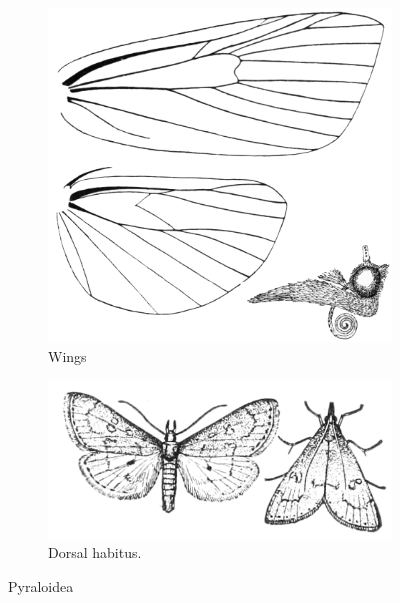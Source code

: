 \documentclass[letterpaper, 11pt]{article}
\begin{document}
\begin{figure}[ht!]
    \centering
    \begin{subfigure}[ht!]{0.38\textwidth}
        \includegraphics[width=\textwidth]{PyralidWings}
        \caption{Wings \citep[composed from][Plate C]{bhl73500}}%
        \label{fig:pyraloid1}
    \end{subfigure}
    \hfill %
    \begin{subfigure}[ht!]{0.55\textwidth}
        \includegraphics[width=\textwidth]{pyralids.png}
        \caption{Dorsal habitus.  \citep[Modified from] [Fig. 296]{bhlitem92183}}
        \label{fig:pyraloid2}
    \end{subfigure}
    \caption{Pyraloidea}\label{fig:pyraloids}
\end{figure}
\end{document}

